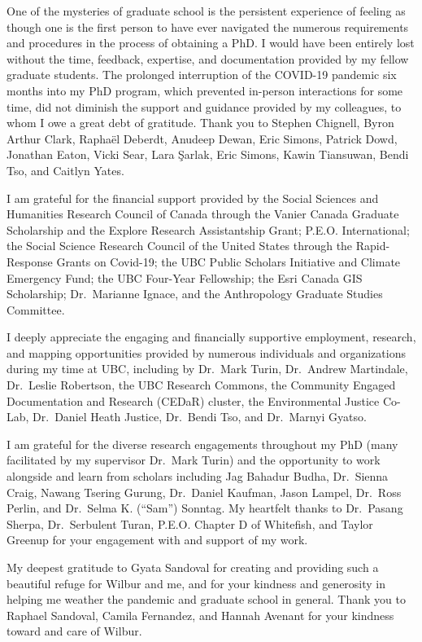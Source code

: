 \documentclass[
]{article}
\begin{document}
One of the mysteries of graduate school is the persistent experience of feeling as though one is the first person to have ever navigated the numerous requirements and procedures in the process of obtaining a PhD. I would have been entirely lost without the time, feedback, expertise, and documentation provided by my fellow graduate students. The prolonged interruption of the COVID-19 pandemic six months into my PhD program, which prevented in-person interactions for some time, did not diminish the support and guidance provided by my colleagues, to whom I owe a great debt of gratitude. Thank you to Stephen Chignell, Byron Arthur Clark, Raphaël Deberdt, Anudeep Dewan, Eric Simons, Patrick Dowd, Jonathan Eaton, Vicki Sear, Lara Şarlak, Eric Simons, Kawin Tiansuwan, Bendi Tso, and Caitlyn Yates.

I am grateful for the financial support provided by the Social Sciences and Humanities Research Council of Canada through the Vanier Canada Graduate Scholarship and the Explore Research Assistantship Grant; P.E.O. International; the Social Science Research Council of the United States through the Rapid-Response Grants on Covid-19; the UBC Public Scholars Initiative and Climate Emergency Fund; the UBC Four-Year Fellowship; the Esri Canada GIS Scholarship; Dr.~Marianne Ignace, and the Anthropology Graduate Studies Committee.

I deeply appreciate the engaging and financially supportive employment, research, and mapping opportunities provided by numerous individuals and organizations during my time at UBC, including by Dr.~Mark Turin, Dr.~Andrew Martindale, Dr.~Leslie Robertson, the UBC Research Commons, the Community Engaged Documentation and Research (CEDaR) cluster, the Environmental Justice Co-Lab, Dr.~Daniel Heath Justice, Dr.~Bendi Tso, and Dr.~Marnyi Gyatso.

I am grateful for the diverse research engagements throughout my PhD (many facilitated by my supervisor Dr.~Mark Turin) and the opportunity to work alongside and learn from scholars including Jag Bahadur Budha, Dr.~Sienna Craig, Nawang Tsering Gurung, Dr.~Daniel Kaufman, Jason Lampel, Dr.~Ross Perlin, and Dr.~Selma K. (``Sam'') Sonntag. My heartfelt thanks to Dr.~Pasang Sherpa, Dr.~Serbulent Turan, P.E.O. Chapter D of Whitefish, and Taylor Greenup for your engagement with and support of my work.

My deepest gratitude to Gyata Sandoval for creating and providing such a beautiful refuge for Wilbur and me, and for your kindness and generosity in helping me weather the pandemic and graduate school in general. Thank you to Raphael Sandoval, Camila Fernandez, and Hannah Avenant for your kindness toward and care of Wilbur.
\end{document}
